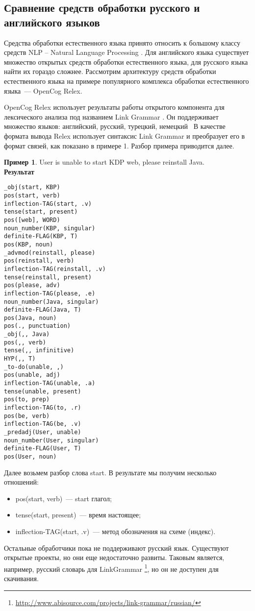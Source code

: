 \subsection{Сравнение средств обработки русского и английского языков} \label{sect2_3}
Средства обработки естественного языка принято относить к большому классу средств NLP – Natural Language Processing \cite{NLP}. Для английского языка существует множество открытых средств обработки естественного языка, для русского языка найти их гораздо сложнее. Рассмотрим архитектуру средств обработки естественного языка на примере популярного комплекса обработки естественного языка~--- OpenCog Relex. \par
OpenCog Relex использует результаты работы открытого компонента для лексического анализа под названием Link Grammar \cite{linkgrammar}. Он поддерживает множество языков: английский, русский, турецкий, немецкий \etc\  В качестве формата вывода Relex использует синтаксис Link Grammar и преобразует его в формат связей, как показано в примере 1. Разбор примера приводится далее. 

\textbf{Пример 1}. User is unable to start KDP web, please reinstall Java.\\
\textbf{Результат} 
\begin{lstlisting}
_obj(start, KBP)
pos(start, verb)
inflection-TAG(start, .v)
tense(start, present)
pos([web], WORD)
noun_number(KBP, singular)
definite-FLAG(KBP, T)
pos(KBP, noun)
_advmod(reinstall, please)
pos(reinstall, verb)
inflection-TAG(reinstall, .v)
tense(reinstall, present)
pos(please, adv)
inflection-TAG(please, .e)
noun_number(Java, singular)
definite-FLAG(Java, T)
pos(Java, noun)
pos(., punctuation)
_obj(,, Java)
pos(,, verb)
tense(,, infinitive)
HYP(,, T)
_to-do(unable, ,)
pos(unable, adj)
inflection-TAG(unable, .a)
tense(unable, present)
pos(to, prep)
inflection-TAG(to, .r)
pos(be, verb)
inflection-TAG(be, .v)
_predadj(User, unable)
noun_number(User, singular)
definite-FLAG(User, T)
pos(User, noun)
\end{lstlisting}




Далее возьмем разбор слова start. В результате мы получим несколько отношений:
\begin{itemize}
	\item pos(start, verb)~--- start глагол;
	\item tense(start, present)~--- время настоящее;
	\item inflection-TAG(start, .v)~--- метод обозначения на схеме (индекс).
\end{itemize} \par
Остальные обработчики пока не поддерживают русский язык. Существуют открытые проекты, но они еще недостаточно развиты. Таковым является, например, русский словарь для LinkGrammar \footnote{\url{http://www.abisource.com/projects/link-grammar/russian/}}, но он не доступен для скачивания. 





